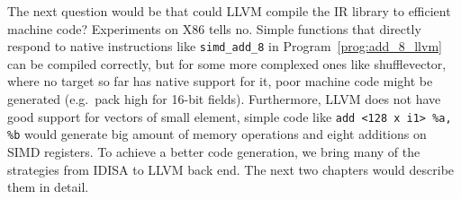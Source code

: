 The next question would be that could LLVM compile the IR library to efficient machine code? Experiments on X86 tells no. Simple functions that directly respond to native instructions like {\tt simd\_add\_8} in Program~\ref{prog:add_8_llvm} can be compiled correctly, but for some more complexed ones like shufflevector, where no target so far has native support for it, poor machine code might be generated (e.g.\ pack high for 16-bit fields). Furthermore, LLVM does not have good support for vectors of small element, simple code like \verb|add <128 x i1> %a, %b| would generate big amount of memory operations and eight additions on SIMD registers. To achieve a better code generation, we bring many of the strategies from IDISA to LLVM back end. The next two chapters would describe them in detail.

